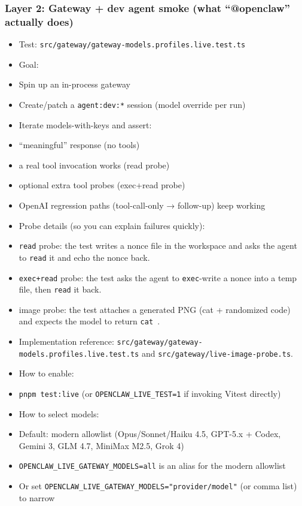\subsubsection{Layer 2: Gateway + dev agent smoke (what “@openclaw” actually does)}


\begin{itemize}
  \item Test: \texttt{src/gateway/gateway-models.profiles.live.test.ts}
  \item Goal:
  \item Spin up an in-process gateway
  \item Create/patch a \texttt{agent:dev:*} session (model override per run)
  \item Iterate models-with-keys and assert:
  \item “meaningful” response (no tools)
  \item a real tool invocation works (read probe)
  \item optional extra tool probes (exec+read probe)
  \item OpenAI regression paths (tool-call-only → follow-up) keep working
  \item Probe details (so you can explain failures quickly):
  \item \texttt{read} probe: the test writes a nonce file in the workspace and asks the agent to \texttt{read} it and echo the nonce back.
  \item \texttt{exec+read} probe: the test asks the agent to \texttt{exec}-write a nonce into a temp file, then \texttt{read} it back.
  \item image probe: the test attaches a generated PNG (cat + randomized code) and expects the model to return \texttt{cat }.
  \item Implementation reference: \texttt{src/gateway/gateway-models.profiles.live.test.ts} and \texttt{src/gateway/live-image-probe.ts}.
  \item How to enable:
  \item \texttt{pnpm test:live} (or \texttt{OPENCLAW\_LIVE\_TEST=1} if invoking Vitest directly)
  \item How to select models:
  \item Default: modern allowlist (Opus/Sonnet/Haiku 4.5, GPT-5.x + Codex, Gemini 3, GLM 4.7, MiniMax M2.5, Grok 4)
  \item \texttt{OPENCLAW\_LIVE\_GATEWAY\_MODELS=all} is an alias for the modern allowlist
  \item Or set \texttt{OPENCLAW\_LIVE\_GATEWAY\_MODELS="provider/model"} (or comma list) to narrow

\end{itemize}
